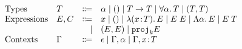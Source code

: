 \[
\begin{array}{llrl}
  \text{Types}       & T    & \Coloneqq & \alpha \mid () \mid T \to T \mid \forall \alpha. \, T \mid (T, T) \\ 
  \text{Expressions} & E, C & \Coloneqq & x \mid () \mid \lambda (x \!:\! T).\, E \mid E \; E \mid \Lambda \alpha.\, E \mid E \; T \\ 
                     &      & \mid      & (E, E) \mid {\texttt{proj}}_{k} E \\
  \text{Contexts} & \Gamma & \Coloneqq & \epsilon \mid \Gamma, \alpha \mid \Gamma, x \!:\! T \\
\end{array}
\]
